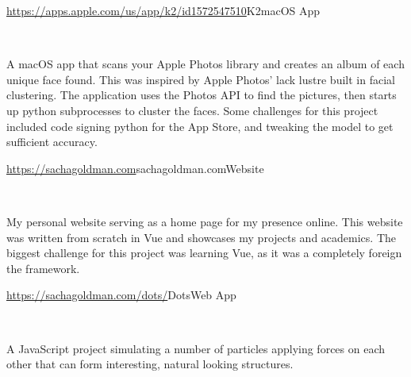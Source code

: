 \documentclass[]{style}
\begin{document}
\begin{entrylist}


\vspace{2mm}

\entry
{\url{https://apps.apple.com/us/app/k2/id1572547510}{K2}}{macOS App}
{ ~ \vspace{-2.5mm}

   

A macOS app that scans your Apple Photos library and creates an album of each unique face found. This was inspired by Apple Photos' lack lustre built in facial clustering. The application uses the Photos API to find the pictures, then starts up python subprocesses  to cluster the faces. Some challenges for this project included code signing python for the App Store, and tweaking the model to get sufficient accuracy.}


\vspace{2mm}

\entry
{\url{https://sachagoldman.com}{sachagoldman.com}}{Website}
{ ~ \vspace{-2.5mm}

 

My personal website serving as a home page for my presence online. This website was written from scratch in Vue and showcases my projects and academics. The biggest challenge for this project was learning Vue, as it was a completely foreign the framework.}



\entry
{\url{https://sachagoldman.com/dots/}{Dots}}{Web App}
{ ~ \vspace{-2.5mm}


A JavaScript project simulating a number of particles applying forces on each other that can form interesting, natural looking structures.}


\end{entrylist}
\end{document}
